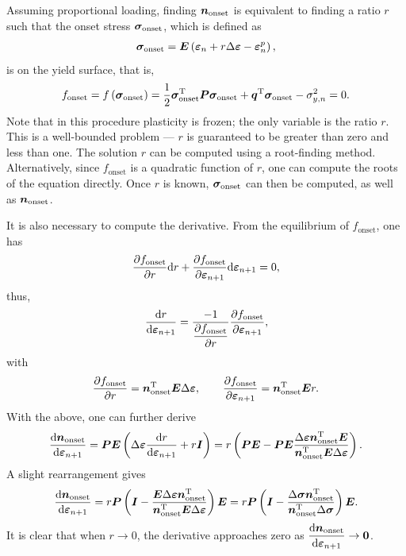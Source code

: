 Assuming proportional loading, finding $\bm{n}_\text{onset}$ is equivalent to finding a ratio $r$ such that the onset stress $\bm{\sigma}_\text{onset}$, which is defined as
\begin{gather}
    \bm{\sigma}_\text{onset}=\bm{E}\left(\bm{\varepsilon}_n+r\Delta\bm{\varepsilon}-\bm{\varepsilon}_n^p\right),
\end{gather}
is on the yield surface, that is,
\begin{gather}
    f_\text{onset}=f\left(\bm{\sigma}_\text{onset}\right)=\dfrac{1}{2}\bm{\sigma}_\text{onset}^{\mathrm{T}}\bm{P}\bm{\sigma}_\text{onset}+\bm{q}^{\mathrm{T}}\bm{\sigma}_\text{onset}-\sigma_{y,n}^2=0.
\end{gather}
Note that in this procedure plasticity is frozen; the only variable is the ratio $r$.
This is a well-bounded problem --- $r$ is guaranteed to be greater than zero and less than one.
The solution $r$ can be computed using a root-finding method.
Alternatively, since $f_\text{onset}$ is a quadratic function of $r$, one can compute the roots of the equation directly.
Once $r$ is known, $\bm{\sigma}_\text{onset}$ can then be computed, as well as $\bm{n}_\text{onset}$.

It is also necessary to compute the derivative.
From the equilibrium of $f_\text{onset}$, one has
\begin{gather}
    \dfrac{\partial{f_\text{onset}}}{\partial{r}}\mathrm{d}r+\dfrac{\partial{f_\text{onset}}}{\partial{\bm{\varepsilon}_{n+1}}}\mathrm{d}\bm{\varepsilon}_{n+1}=0,
\end{gather}
thus,
\begin{gather}
    \dfrac{\mathrm{d}r}{\mathrm{d}\bm{\varepsilon}_{n+1}}=\dfrac{-1}{\dfrac{\partial{f_\text{onset}}}{\partial{r}}}\dfrac{\partial{f_\text{onset}}}{\partial{\bm{\varepsilon}_{n+1}}},
\end{gather}
with
\begin{gather}
    \dfrac{\partial{f_\text{onset}}}{\partial{r}}=\bm{n}_\text{onset}^{\mathrm{T}}\bm{E}\Delta\bm{\varepsilon},\qquad
    \dfrac{\partial{f_\text{onset}}}{\partial{\bm{\varepsilon}_{n+1}}}=\bm{n}_\text{onset}^{\mathrm{T}}\bm{E}r.
\end{gather}
With the above, one can further derive
\begin{gather}
    \dfrac{\mathrm{d}\bm{n}_\text{onset}}{\mathrm{d}\bm{\varepsilon}_{n+1}}=\bm{PE}\left(\Delta\bm{\varepsilon}\dfrac{\mathrm{d}r}{\mathrm{d}\bm{\varepsilon}_{n+1}}+r\bm{I}\right)=r\left(\bm{PE}-\bm{PE}\dfrac{\Delta\bm{\varepsilon}\bm{n}_\text{onset}^{\mathrm{T}}\bm{E}}{\bm{n}_\text{onset}^{\mathrm{T}}\bm{E}\Delta\bm{\varepsilon}}\right).
\end{gather}
A slight rearrangement gives
\begin{gather}
    \dfrac{\mathrm{d}\bm{n}_\text{onset}}{\mathrm{d}\bm{\varepsilon}_{n+1}}=r\bm{P}\left(\bm{I}-\dfrac{\bm{E}\Delta\bm{\varepsilon}\bm{n}_\text{onset}^{\mathrm{T}}}{\bm{n}_\text{onset}^{\mathrm{T}}\bm{E}\Delta\bm{\varepsilon}}\right)\bm{E}=r\bm{P}\left(\bm{I}-\dfrac{\Delta\bm{\sigma}\bm{n}_\text{onset}^{\mathrm{T}}}{\bm{n}_\text{onset}^{\mathrm{T}}\Delta\bm{\sigma}}\right)\bm{E}.
\end{gather}
It is clear that when $r\rightarrow0$, the derivative approaches zero as $\dfrac{\mathrm{d}\bm{n}_\text{onset}}{\mathrm{d}\bm{\varepsilon}_{n+1}}\rightarrow\bm{0}$.

